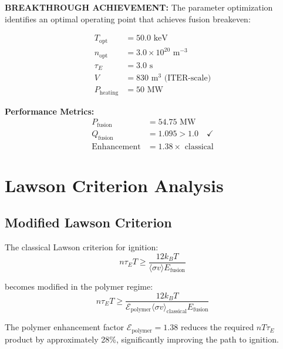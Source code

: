 \documentclass[12pt,a4paper]{article}
\begin{document}
\textcolor{breakthrough}{\textbf{BREAKTHROUGH ACHIEVEMENT:}} The parameter optimization identifies an optimal operating point that achieves fusion breakeven:

\begin{tcolorbox}[colback=breakthrough!10, colframe=breakthrough, title=\textbf{Optimal Fusion Breakeven Conditions}]
\begin{align}
T_{\text{opt}} &= 50.0 \text{ keV} \\
n_{\text{opt}} &= 3.0 \times 10^{20} \text{ m}^{-3} \\
\tau_{E} &= 3.0 \text{ s} \\
V &= 830 \text{ m}^3 \text{ (ITER-scale)} \\
P_{\text{heating}} &= 50 \text{ MW}
\end{align}

\textbf{Performance Metrics:}
\begin{align}
P_{\text{fusion}} &= 54.75 \text{ MW} \\
Q_{\text{fusion}} &= \boxed{1.095} > 1.0 \quad \checkmark \\
\text{Enhancement} &= 1.38 \times \text{ classical}
\end{align}
\end{tcolorbox}

\section{Lawson Criterion Analysis}

\subsection{Modified Lawson Criterion}

The classical Lawson criterion for ignition:
\begin{equation}
n \tau_E T \geq \frac{12 k_B T}{\langle\sigma v\rangle E_{\text{fusion}}}
\end{equation}

becomes modified in the polymer regime:
\begin{equation}
\boxed{
n \tau_E T \geq \frac{12 k_B T}{\mathcal{E}_{\text{polymer}} \langle\sigma v\rangle_{\text{classical}} E_{\text{fusion}}}
}
\end{equation}

The polymer enhancement factor $\mathcal{E}_{\text{polymer}} = 1.38$ reduces the required $nT\tau_E$ product by approximately 28\%, significantly improving the path to ignition.
\end{document}
